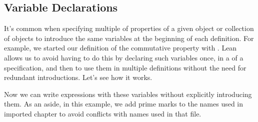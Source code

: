 \documentclass[letterpaper,10pt,english]{sphinxmanual}
\begin{document}
\subsection{Variable Declarations}
\label{\detokenize{A_01_Propositional_Logic:variable-declarations}}
\sphinxAtStartPar
It’s common when specifying multiple of properties of a
given object or collection of objects to introduce the
same variables at the beginning of each definition. For
example, we started our definition of the commutative
property with .
Lean allows us to avoid having to do this by declaring
such variables once, in a  of a specification,
and then to use them in multiple definitions without
the need for redundant introductions. Let’s see how it
works.

\begin{sphinxVerbatim}[commandchars=\\\{\}]
 

          
\end{sphinxVerbatim}

\sphinxAtStartPar
Now we can write expressions with these variables
without explicitly introducing them. As an aside, in
this example, we add prime marks to the names used in
imported chapter to avoid conflicts with names used in
that file.

\begin{sphinxVerbatim}[commandchars=\\\{\}]
           
            
\end{sphinxVerbatim}
\end{document}
